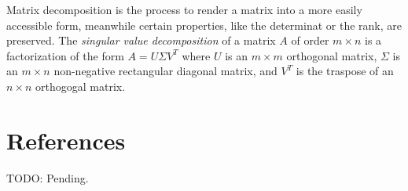 Matrix decomposition is the process to render a matrix into a more easily accessible form, meanwhile certain properties, like the determinat or the rank, are preserved. The \emph{singular value decomposition} of a matrix $A$ of order $m \times n$ is a factorization of the form $A = U \Sigma V^T$ where $U$ is an $m \times m$ orthogonal matrix, $\Sigma$ is an $m \times n$ non-negative rectangular diagonal matrix, and $V^T$ is the traspose of an $n \times n$ orthogogal matrix. 



%
%

\section*{References}

{\color{red} TODO: Pending.}
